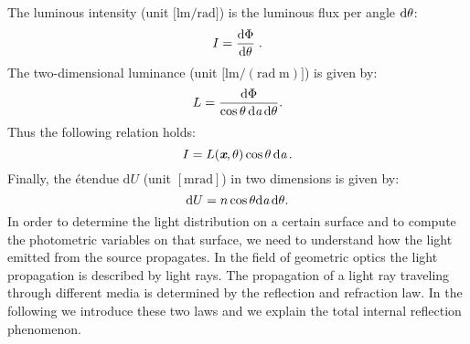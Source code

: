  The luminous intensity \big(unit $\big[\textrm{lm}/\textrm{rad}\big]$\big) is the luminous flux per angle $\textrm{d}\mbox{$\theta$}$:
 \begin{equation}
 I=\frac{\textrm{d}\Phi}{\textrm{d}\mbox{$\theta$}}\;.
 \end{equation}
 The two-dimensional luminance \big(unit $\big[\textrm{lm}/(\textrm{rad}\; \textrm{m})\big]$\big) is given by:
 \begin{equation}
 L= \frac{\textrm {d}\Phi}{\cos\mbox{$\theta$}\,\textrm{d}\textit{a} \,\textrm{d}\mbox{$\theta$}}.
 \end{equation}
 Thus the following relation holds:
 \begin{equation}
 I = L(\textit{\textbf{x}}, \mbox{$\theta$})\cos\mbox{$\theta$}\,\textrm{d}\textit{a}\,.
 \end{equation}
 Finally, the \'{e}tendue $\textrm{d}U $ (unit $[\textrm{m}\textrm{rad}]$) in two dimensions is given by:
\begin{equation}\label{etendue2d}
\textrm{d}U = n\cos\mbox{$\theta$}\textrm{d}\textit{a}\,\textrm{d}\mbox{$\theta$}.
\end{equation}
In order to determine the light distribution on a certain surface and to compute the photometric variables on that surface, we need to understand how the light emitted from the source propagates. In the field of geometric optics the light propagation is described by light rays.
The propagation of a light ray traveling through  different media is determined by the reflection and refraction law.
In the following we introduce these two laws and we explain the total internal reflection phenomenon.
